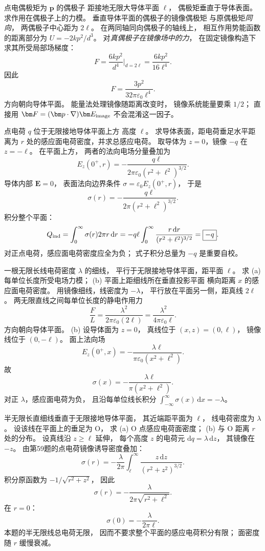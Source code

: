 点电偶极矩为 $\bm p$ 的偶极子
距接地无限大导体平面 $\ell$，
偶极矩垂直于导体表面。
求作用在偶极子上的力模。
\exsolution
垂直导体平面的偶极子的镜像偶极矩
与原偶极矩\emph{同向}，
两偶极子中心距为 $2\ell$。
在两同轴同向偶极子的轴线上，
相互作用势能函数的距离部分为
$U=-2kp^2/d^3$。
对\emph{真偶极子在镜像场中的力}，
在固定镜像构造下求其所受局部场梯度：
\[
F=\frac{6kp^2}{d^4}\bigg|_{d=2\ell}
=\frac{6kp^2}{16\ell^4}.
\]
因此
\[
\boxed{F=\frac{3p^2}{32\pi\varepsilon_0\ell^4}}.
\]
方向朝向导体平面。
\excheck 能量法处理镜像随距离改变时，
镜像系统能量要乘 $1/2$；
直接用 $\bm F=(\bm p\cdot\nabla)\bm E_{\rm image}$
不会混淆这一因子。

点电荷 $q$ 位于无限接地导体平面上方
高度 $\ell$。
求导体表面，距电荷垂足水平距离为 $r$
处的感应面电荷密度，并求总感应电荷。
\exsolution
取导体为 $z=0$，镜像 $-q$ 在 $z=-\ell$。
在平面上方，
两者的法向电场分量叠加为
\[
E_z(0^+,r)=
-\frac{q\ell}{2\pi\varepsilon_0
(r^2+\ell^2)^{3/2}}.
\]
导体内部 $\bm E=0$，
表面法向边界条件
$\sigma=\varepsilon_0E_z(0^+,r)$，
于是
\[
\boxed{\sigma(r)=
-\frac{q\ell}{2\pi(r^2+\ell^2)^{3/2}}}.
\]
积分整个平面：
\[
Q_{\rm ind}
=\int_0^\infty\sigma(r)2\pi r\,\mathrm dr
=-q\ell\int_0^\infty
\frac{r\,\mathrm dr}{(r^2+\ell^2)^{3/2}}
=\boxed{-q}.
\]
\excheck 对正点电荷，感应面电荷密度应全为负；
式子积分总量为 $-q$ 是重要自校。

一根无限长线电荷密度 $\lambda$ 的细线，
平行于无限接地导体平面，距平面 $\ell$。
求 (a) 每单位长度所受电场力模；
(b) 平面上距细线所在垂直投影平面
横向距离 $x$ 的感应面电荷密度。
\exsolution
用镜像细线，线密度为 $-\lambda$，
平行放在平面另一侧，距真线 $2\ell$。
两无限直线之间每单位长度的静电作用力
\[
\boxed{\frac FL=
\frac{\lambda^2}{2\pi\varepsilon_0(2\ell)}
=\frac{\lambda^2}{4\pi\varepsilon_0\ell}}.
\]
方向朝向导体平面。
(b) 设导体面为 $z=0$，
真线位于 $(x,z)=(0,\ell)$，
镜像线位于 $(0,-\ell)$。
面上法向场
\[
E_z(0^+,x)
=-\frac{\lambda\ell}{\pi\varepsilon_0(x^2+\ell^2)}.
\]
故
\[
\boxed{\sigma(x)=
-\frac{\lambda\ell}{\pi(x^2+\ell^2)}}.
\]
\excheck 对正 $\lambda$，感应面电荷为负，
且沿每单位线长积分
$\int_{-\infty}^\infty\sigma(x)\,\mathrm dx=-\lambda$。

半无限长直细线垂直于无限接地导体平面，
其近端距平面为 $\ell$，
线电荷密度为 $\lambda$。
设该线在平面上的垂足为 O，
求 (a) O 点感应电荷面密度；
(b) 与 O 距离 $r$ 处的分布。
\exsolution
设真线沿 $z\ge\ell$ 延伸，
每个高度 $z$ 的电荷元
$\mathrm dq=\lambda\,\mathrm dz$，
其镜像在 $-z$。
由第59题的点电荷镜像诱导密度叠加：
\[
\sigma(r)=
-\frac{\lambda}{2\pi}
\int_\ell^\infty
\frac{z\,\mathrm dz}{(r^2+z^2)^{3/2}}.
\]
积分原函数为
$-1/\sqrt{r^2+z^2}$，
因此
\[
\boxed{\sigma(r)=
-\frac{\lambda}{2\pi\sqrt{r^2+\ell^2}}}.
\]
在 $r=0$：
\[
\boxed{\sigma(0)=-\frac{\lambda}{2\pi\ell}}.
\]
\excheck 本题的半无限线总电荷无限，
因而不要求整个平面的感应电荷积分有限；
面密度随 $r$ 缓慢衰减。

